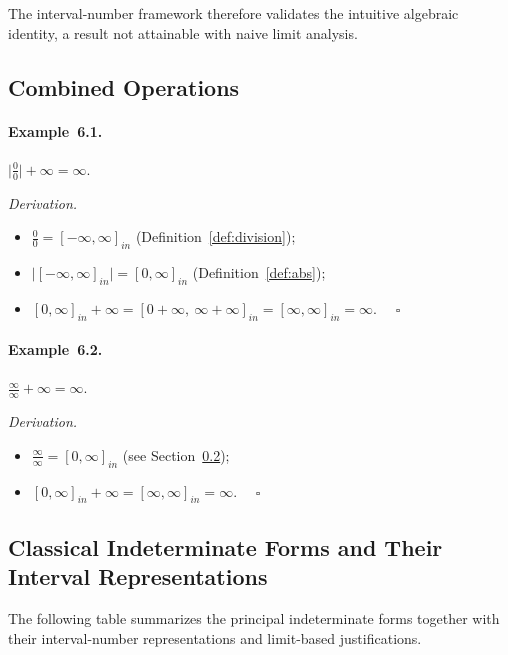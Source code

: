 \documentclass[11pt,a4paper]{article}
\theoremstyle{paperdef}
\newcommand{\inI}[1]{[#1]_{in}}
\begin{document}
The interval-number framework therefore validates the intuitive
algebraic identity, a result not attainable with naive limit
analysis.

\subsection{Combined Operations}

\paragraph{Example~6.1.}
$\lvert \tfrac{0}{0} \rvert + \infty = \infty.$

\emph{Derivation.}
\begin{itemize}[leftmargin=2em]
  \item $\tfrac{0}{0} = \inI{-\infty, \infty}$
    (Definition~\ref{def:division});
  \item $\lvert \inI{-\infty, \infty} \rvert = \inI{0, \infty}$
    (Definition~\ref{def:abs});
  \item $\inI{0, \infty} + \infty
    = \inI{0 + \infty,\ \infty + \infty}
    = \inI{\infty, \infty} = \infty$. $\quad\square$
\end{itemize}

\paragraph{Example~6.2.}
$\tfrac{\infty}{\infty} + \infty = \infty.$

\emph{Derivation.}
\begin{itemize}[leftmargin=2em]
  \item $\tfrac{\infty}{\infty} = \inI{0, \infty}$
    (see Section~\ref{sec:classical-forms});
  \item $\inI{0, \infty} + \infty = \inI{\infty, \infty} = \infty$.
    $\quad\square$
\end{itemize}

\subsection{Classical Indeterminate Forms and Their Interval Representations}\label{sec:classical-forms}

The following table summarizes the principal indeterminate forms
together with their interval-number representations and limit-based
justifications.
\end{document}
